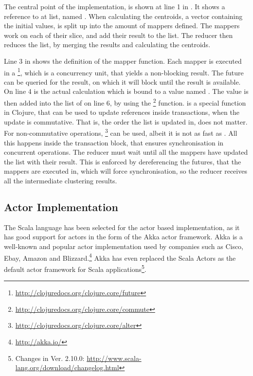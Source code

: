 The central point of the implementation, is shown at line 1 in . It shows a reference to at list, named . When calculating the centroids, a vector containing the initial values, is split up into the amount of mappers defined. The mappers work on each of their slice, and add their result to the  list. The reducer then reduces the list, by merging the results and calculating the centroids.

Line 3 in  shows the definition of the mapper function. Each mapper is executed in a \footnote{\url{http://clojuredocs.org/clojure.core/future}}, which is a concurrency unit, that yields a non-blocking result. The future can be queried for the result, on which it will block until the result is available. On line 4 is the actual calculation which is bound to a value named . The  value is then added into the list of  on line 6, by using the \footnote{\url{http://clojuredocs.org/clojure.core/commute}} function.  is a special function in Clojure, that can be used to update references inside transactions, when the update is commutative. That is, the order the list is updated in, does not matter. For non-commutative operations, \footnote{\url{http://clojuredocs.org/clojure.core/alter}} can be used, albeit it is not as fast as . All this happens inside the  transaction block, that ensures synchronisation in concurrent operations. The reducer must wait until all the mappers have updated the list with their result. This is enforced by dereferencing the futures, that the mappers are executed in, which will force synchronisation, so the reducer receives all the intermediate clustering results.

\subsection{Actor Implementation}
The Scala language has been selected for the actor based implementation, as it has good support for actors in the form of the Akka actor framework. Akka is a well-known and popular actor implementation used by companies such as Cisco, Ebay, Amazon and Blizzard.\footnote{\url{http://akka.io/}} Akka has even replaced the Scala Actors as the default actor framework for Scala applications\footnote{Changes in Ver. 2.10.0: \url{http://www.scala-lang.org/download/changelog.html}}.

